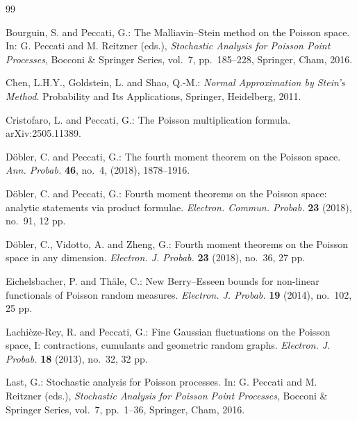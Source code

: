 \documentclass[ECP,preprint]{ejpecp}
\begin{document}
\begin{thebibliography}{99}



Bourguin, S. and Peccati, G.:
The Malliavin--Stein method on the Poisson space.
In: G. Peccati and M. Reitzner (eds.),
\emph{Stochastic Analysis for Poisson Point Processes},
Bocconi \& Springer Series, vol.~7, pp.~185--228,
Springer, Cham, 2016.

Chen, L.H.Y., Goldstein, L. and Shao, Q.-M.:
\emph{Normal Approximation by Stein's Method}.
Probability and Its Applications,
Springer, Heidelberg, 2011.


Cristofaro, L. and Peccati, G.:
The Poisson multiplication formula.
arXiv:2505.11389.

D\"obler, C. and Peccati, G.:
The fourth moment theorem on the Poisson space.
\emph{Ann. Probab.} \textbf{46}, no.~4, (2018), 1878--1916.

D\"obler, C. and Peccati, G.:
Fourth moment theorems on the Poisson space:
analytic statements via product formulae.
\emph{Electron. Commun. Probab.} \textbf{23} (2018),
 no.~91, 12 pp.

D\"obler, C., Vidotto, A. and Zheng, G.:
Fourth moment theorems on the Poisson space in any dimension.
\emph{Electron. J. Probab.} \textbf{23} (2018),
 no.~36, 27 pp.

Eichelsbacher, P. and Th\"ale, C.:
New Berry--Esseen bounds for non-linear functionals of Poisson random
measures.
\emph{Electron. J. Probab.} \textbf{19} (2014),
  no.~102, 25 pp.

Lachi\`eze-Rey, R. and Peccati, G.:
Fine Gaussian fluctuations on the Poisson space, I:
contractions, cumulants and geometric random graphs.
\emph{Electron. J. Probab.} \textbf{18} (2013),
  no.~32, 32 pp.



Last, G.:
Stochastic analysis for Poisson processes.
In: G. Peccati and M. Reitzner (eds.),
\emph{Stochastic Analysis for Poisson Point Processes},
Bocconi \& Springer Series, vol.~7, pp.~1--36,
Springer, Cham, 2016.




\end{thebibliography}
\end{document}

